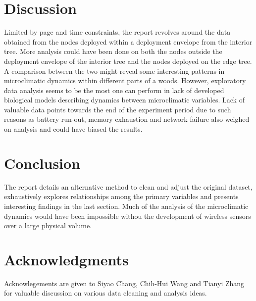 \documentclass[11pt]{article}
\begin{document}
\section{Discussion}
Limited by page and time constraints, the report revolves around the data obtained from the nodes deployed within a deployment envelope from the interior tree. More analysis could have been done on both the nodes outside the deployment envelope of the interior tree and the nodes deployed on the edge tree. A comparison between the two might reveal some interesting patterns in microclimatic dynamics within different parts of a woods. However, exploratory data analysis seems to be the most one can perform in lack of developed biological models describing dynamics between microclimatic variables. Lack of valuable data points towards the end of the experiment period due to such reasons as battery run-out, memory exhaustion and network failure also weighed on analysis and could have biased the results.

\section{Conclusion}
The report details an alternative method to clean and adjust the original dataset, exhaustively explores relationships among the primary variables and presents interesting findings in the last section. Much of the analysis of the microclimatic dynamics would have been impossible withou the development of wireless sensors over a large physical volume.

\section*{Acknowledgments}
Acknowlegements are given to Siyao Chang, Chih-Hui Wang and Tianyi Zhang for valuable discussion on various data cleaning and analysis ideas.



\end{document}
